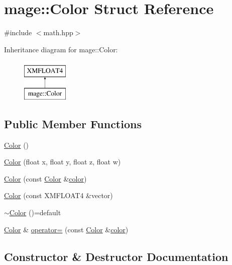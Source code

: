 \hypertarget{structmage_1_1_color}{}\section{mage\+:\+:Color Struct Reference}
\label{structmage_1_1_color}


{\ttfamily \#include $<$math.\+hpp$>$}

Inheritance diagram for mage\+:\+:Color\+:\begin{figure}[H]
\begin{center}
\leavevmode
\includegraphics[height=2.000000cm]{structmage_1_1_color}
\end{center}
\end{figure}
\subsection*{Public Member Functions}
\begin{DoxyCompactItemize}
\item 
\hyperlink{structmage_1_1_color_aacf48e59425346eb80e7592bbcd6b55d}{Color} ()
\item 
\hyperlink{structmage_1_1_color_ae906a0c456f1d21df8a6d5476918a913}{Color} (float x, float y, float z, float w)
\item 
\hyperlink{structmage_1_1_color_aabf202b6ec0c2d1fc788c9bc69f185ff}{Color} (const \hyperlink{structmage_1_1_color}{Color} \&\hyperlink{namespacemage_a56eceea5a9bceb2b56073f3ea4945781}{color})
\item 
\hyperlink{structmage_1_1_color_ab70f74c89738d5d60a8ac2c46c0be69e}{Color} (const X\+M\+F\+L\+O\+A\+T4 \&vector)
\item 
\hyperlink{structmage_1_1_color_aa4df1c9718b7846adf77fbeed79ac219}{$\sim$\+Color} ()=default
\item 
\hyperlink{structmage_1_1_color}{Color} \& \hyperlink{structmage_1_1_color_a006c8ce9bf69e54598c5981fe79d742c}{operator=} (const \hyperlink{structmage_1_1_color}{Color} \&\hyperlink{namespacemage_a56eceea5a9bceb2b56073f3ea4945781}{color})
\end{DoxyCompactItemize}


\subsection{Constructor \& Destructor Documentation}
\hypertarget{structmage_1_1_color_aacf48e59425346eb80e7592bbcd6b55d}{}\label{structmage_1_1_color_aacf48e59425346eb80e7592bbcd6b55d} 
